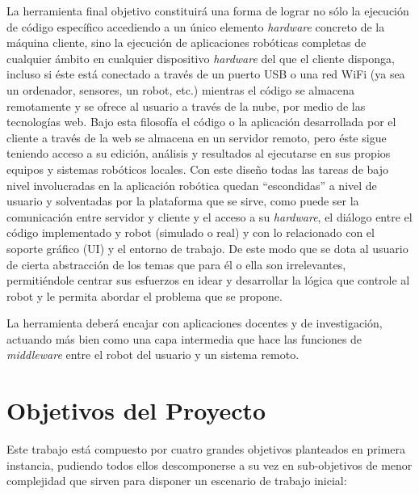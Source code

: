 La herramienta final objetivo constituirá una forma de lograr no sólo la ejecución de código específico accediendo a un único elemento \textit{hardware} concreto de la máquina cliente, sino la ejecución de aplicaciones robóticas completas de cualquier ámbito en cualquier dispositivo \textit{hardware} del que el cliente disponga, incluso si éste está conectado a través de un puerto USB o una red WiFi (ya sea un ordenador, sensores, un robot, etc.) mientras el código se almacena remotamente y se ofrece al usuario a través de la nube, por medio de las tecnologías web. Bajo esta filosofía el código o la aplicación desarrollada por el cliente a través de la web se almacena en un servidor remoto, pero éste sigue teniendo acceso a su edición, análisis y resultados al ejecutarse en sus propios equipos y sistemas robóticos locales. Con este diseño todas las tareas de bajo nivel involucradas en la aplicación robótica quedan ``escondidas'' a nivel de usuario y solventadas por la plataforma que se sirve, como puede ser la comunicación entre servidor y cliente y el acceso a su \textit{hardware}, el diálogo entre el código implementado y robot (simulado o real) y con lo relacionado con el soporte gráfico (UI) y el entorno de trabajo. De este modo que se dota al usuario de cierta abstracción de los temas que para él o ella son irrelevantes, permitiéndole centrar sus esfuerzos en idear y desarrollar la lógica que controle al robot y le permita abordar el problema que se propone.

La herramienta deberá encajar con aplicaciones docentes y de investigación, actuando más bien como una capa intermedia que hace las funciones de \textit{middleware} entre el robot del usuario y un sistema remoto.

\section{Objetivos del Proyecto}

Este trabajo está compuesto por cuatro grandes objetivos planteados en primera instancia, pudiendo todos ellos descomponerse a su vez en sub-objetivos de menor complejidad que sirven para disponer un escenario de trabajo inicial:

